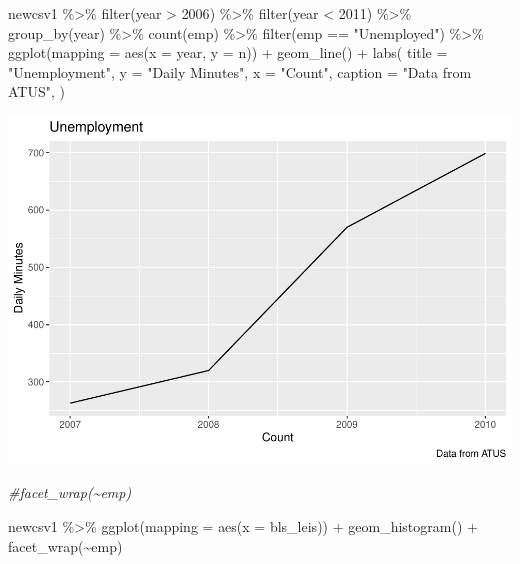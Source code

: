 \documentclass[
]{article}
\newenvironment{Shaded}{\begin{snugshade}}{\end{snugshade}}
\newcommand{\AttributeTok}[1]{\textcolor[rgb]{0.77,0.63,0.00}{#1}}
\newcommand{\CommentTok}[1]{\textcolor[rgb]{0.56,0.35,0.01}{\textit{#1}}}
\newcommand{\DecValTok}[1]{\textcolor[rgb]{0.00,0.00,0.81}{#1}}
\newcommand{\FunctionTok}[1]{\textcolor[rgb]{0.00,0.00,0.00}{#1}}
\newcommand{\NormalTok}[1]{#1}
\newcommand{\SpecialCharTok}[1]{\textcolor[rgb]{0.00,0.00,0.00}{#1}}
\newcommand{\StringTok}[1]{\textcolor[rgb]{0.31,0.60,0.02}{#1}}
\begin{document}
\begin{Shaded}
\begin{Highlighting}[]
\NormalTok{newcsv1 }\SpecialCharTok{\%\textgreater{}\%}
  \FunctionTok{filter}\NormalTok{(year }\SpecialCharTok{\textgreater{}} \DecValTok{2006}\NormalTok{) }\SpecialCharTok{\%\textgreater{}\%}
  \FunctionTok{filter}\NormalTok{(year }\SpecialCharTok{\textless{}} \DecValTok{2011}\NormalTok{) }\SpecialCharTok{\%\textgreater{}\%}
  \FunctionTok{group\_by}\NormalTok{(year) }\SpecialCharTok{\%\textgreater{}\%}
  \FunctionTok{count}\NormalTok{(emp) }\SpecialCharTok{\%\textgreater{}\%}
  \FunctionTok{filter}\NormalTok{(emp }\SpecialCharTok{==} \StringTok{"Unemployed"}\NormalTok{) }\SpecialCharTok{\%\textgreater{}\%}
  \FunctionTok{ggplot}\NormalTok{(}\AttributeTok{mapping =} \FunctionTok{aes}\NormalTok{(}\AttributeTok{x =}\NormalTok{ year, }\AttributeTok{y =}\NormalTok{ n)) }\SpecialCharTok{+}
  \FunctionTok{geom\_line}\NormalTok{() }\SpecialCharTok{+}
  \FunctionTok{labs}\NormalTok{(}
  \AttributeTok{title =} \StringTok{"Unemployment"}\NormalTok{,}
  \AttributeTok{y =} \StringTok{"Daily Minutes"}\NormalTok{,}
  \AttributeTok{x =} \StringTok{"Count"}\NormalTok{,}
  \AttributeTok{caption =} \StringTok{"Data from ATUS"}\NormalTok{,}
\NormalTok{)}
\end{Highlighting}
\end{Shaded}

\includegraphics{Paper2_files/figure-latex/employment-1.pdf}

\begin{Shaded}
\begin{Highlighting}[]
  \CommentTok{\#facet\_wrap(\textasciitilde{}emp)}

\NormalTok{newcsv1 }\SpecialCharTok{\%\textgreater{}\%}
  \FunctionTok{ggplot}\NormalTok{(}\AttributeTok{mapping =} \FunctionTok{aes}\NormalTok{(}\AttributeTok{x =}\NormalTok{ bls\_leis)) }\SpecialCharTok{+}
  \FunctionTok{geom\_histogram}\NormalTok{() }\SpecialCharTok{+}
  \FunctionTok{facet\_wrap}\NormalTok{(}\SpecialCharTok{\textasciitilde{}}\NormalTok{emp)}
\end{Highlighting}
\end{Shaded}
\end{document}
